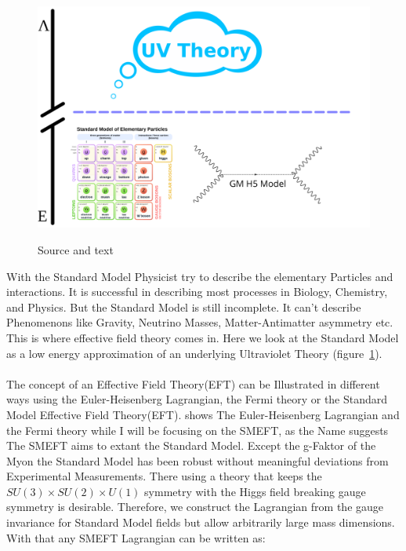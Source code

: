 \documentclass[../Bachelorarbeit.tex]{subfiles}
\begin{document}
\label{sec:EFT}

\begin{figure}[h]
    \centering
    \includegraphics[width=\textwidth]{images/EFT_Model.png}
    \label{fig:EFT_sketch}
    \caption{Source and text \cite{Brivio.2017}}
\end{figure}

With the Standard Model Physicist try to describe the elementary Particles and interactions. It is successful in describing most processes in Biology, Chemistry, and Physics.
But the Standard Model is still incomplete. It can't describe Phenomenons like Gravity, Neutrino Masses, Matter-Antimatter asymmetry etc. This is where effective field theory comes in.
Here we look at the Standard Model as a low energy approximation of an underlying Ultraviolet Theory (figure~\ref{fig:EFT_sketch}).
\\\\
The concept of an Effective Field Theory(EFT) can be Illustrated in different ways using the Euler-Heisenberg Lagrangian, the Fermi theory or the Standard Model Effective Field Theory(EFT).
\cite{Pich.1998} shows The Euler-Heisenberg Lagrangian and the Fermi theory while I will be focusing on the SMEFT, as the Name suggests The SMEFT aims to extant the Standard Model.
Except the g-Faktor of the Myon the Standard Model has been robust without meaningful deviations from Experimental Measurements. 
There using a theory that keeps the $SU(3) \times SU(2) \times U(1)$ symmetry with the Higgs field breaking gauge symmetry is desirable.
Therefore, we construct the Lagrangian from the gauge invariance for Standard Model fields but allow arbitrarily large mass dimensions. 
With that any SMEFT Lagrangian can be written as:
\end{document}
